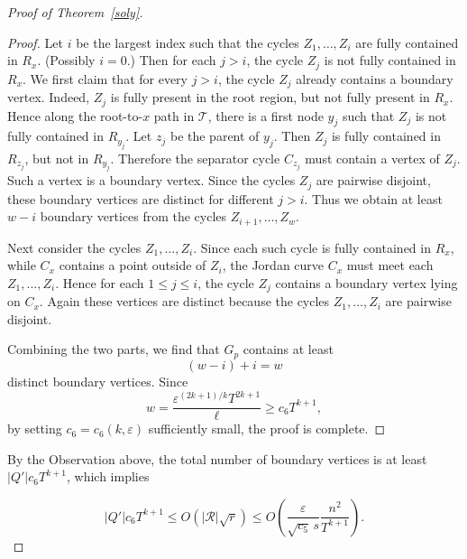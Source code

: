 \documentclass[11pt]{article}
\theoremstyle{plain}
\theoremstyle{definition}
\theoremstyle{remark}
\begin{document}
\begin{proof}[Proof of Theorem~\ref{soly}]
\begin{proof}
Let \(i\) be the largest index such that the cycles \(Z_1,\dots,Z_i\) are fully contained in \(R_x\). (Possibly \(i=0\).) Then for each \(j>i\), the cycle \(Z_j\) is not fully contained in \(R_x\). We first claim that for every \(j>i\), the cycle \(Z_j\) already contains a boundary vertex. Indeed, \(Z_j\) is fully present in the root region, but not fully present in \(R_x\). Hence along the root-to-\(x\) path in \(\mathcal T\), there is a first node \(y_j\) such that \(Z_j\) is not fully contained in \(R_{y_j}\). Let \(z_j\) be the parent of \(y_j\). Then \(Z_j\) is fully contained in \(R_{z_j}\), but not in \(R_{y_j}\). Therefore the separator cycle \(C_{z_j}\) must contain a vertex of \(Z_j\). Such a vertex is a boundary vertex. Since the cycles \(Z_j\) are pairwise disjoint, these boundary vertices are distinct for different \(j>i\). Thus we obtain at least \(w-i\) boundary vertices from the cycles \(Z_{i+1},\dots,Z_w\).

Next consider the cycles \(Z_1,\dots,Z_i\). Since each such cycle is fully contained in \(R_x\), while \(C_x\) contains a point outside of $Z_i$, the Jordan curve \(C_x\) must meet each \(Z_1,\ldots, Z_i\). Hence for each \(1\le j\le i\), the cycle \(Z_j\) contains a boundary vertex lying on \(C_x\). Again these vertices are distinct because the cycles \(Z_1,\dots,Z_i\) are pairwise disjoint.

Combining the two parts, we find that \(G_p\) contains at least
\[
(w-i)+i=w
\]
distinct boundary vertices. Since
\[
w=\frac{\varepsilon^{(2k+1)/k}T^{2k+1}}{\ell}
\geq c_6 T^{k+1},
\]
by setting \(c_6=c_6(k,\varepsilon)\) sufficiently small, the proof is complete.
\end{proof}



























By the Observation above, the total number of boundary vertices is at least $|Q'|c_6T^{k + 1}$, which implies


$$|Q'|c_6T^{k + 1} \leq O( |\mathcal R|\sqrt{r}) \leq O\!\left(
\frac{\varepsilon}{\sqrt{c_5}\,s}
\frac{n^2}{T^{k+1}}
\right).
$$



\end{proof}
\end{document}
